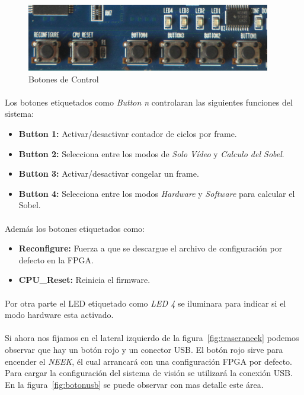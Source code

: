 \documentclass[a4paper,12pt,titlepage,final]{book}
\begin{document}
\begin{figure}[p]
\centering
\includegraphics[width=0.95\textwidth]{./figuras/NEEK/BotonesSetup.png}
\caption{Botones de Control}
\label{fig:botonescontrol}
\end{figure}

\clearpage

\paragraph{}
Los botones etiquetados como \textit{Button n} controlaran las siguientes funciones del sistema:
\begin{itemize}
\item \textbf{Button 1:} Activar/desactivar contador de ciclos por frame.
\item \textbf{Button 2:} Selecciona entre los modos de \textit{Solo Vídeo} y \textit{Calculo del Sobel}.
\item \textbf{Button 3:} Activar/desactivar congelar un frame.
\item \textbf{Button 4:} Selecciona entre los modos \textit{Hardware} y \textit{Software} para calcular el Sobel. 
\end{itemize}

\paragraph{}
Además los botones etiquetados como:
\begin{itemize}
\item \textbf{Reconfigure:} Fuerza a que se descargue el archivo de configuración por defecto en la FPGA. 
\item \textbf{CPU\_Reset:} Reinicia el firmware.
\end{itemize}

\paragraph{}
Por otra parte el LED etiquetado como \textit{LED 4} se iluminara para indicar si el modo hardware esta activado. 

\paragraph{}
Si ahora nos fijamos en el lateral izquierdo de la figura~\ref{fig:traseraneek} podemos observar que hay un botón rojo y un conector USB. El botón rojo sirve para encender el \textit{NEEK}, él cual arrancará con una configuración FPGA por defecto. Para cargar la configuración del sistema de visión se utilizará la conexión USB. En la figura~\ref{fig:botonusb} se puede observar con mas detalle este área.
\end{document}
